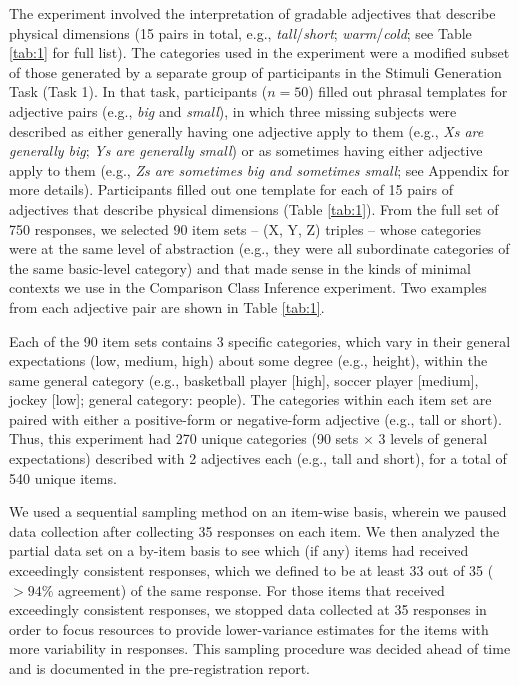 \documentclass[doc]{apa6}
\begin{document}
The experiment involved the interpretation of gradable adjectives that describe physical dimensions (15 pairs in total, e.g., \emph{tall}/\emph{short}; \emph{warm}/\emph{cold}; see Table \ref{tab:1} for full list). 
The categories used in the experiment were a modified subset of those generated by a separate group of participants in the Stimuli Generation Task (Task 1). 
In that task, participants ($n=50$) filled out phrasal templates for adjective pairs (e.g., \emph{big} and \emph{small}), in which three missing subjects were described as either generally having one adjective apply to them (e.g., \emph{Xs are generally big}; \emph{Ys are generally small}) or as sometimes having either adjective apply to them (e.g., \emph{Zs are sometimes big and sometimes small}; see Appendix for more details). 
Participants filled out one template for each of 15 pairs of adjectives that describe physical dimensions (Table \ref{tab:1}). 
From the full set of 750 responses, we selected 90 item sets -- (X, Y, Z)  triples -- whose categories were at the same level of abstraction  (e.g., they were all subordinate categories of the same basic-level category) and that made sense in the kinds of minimal contexts we use in the Comparison Class Inference experiment.
Two examples from each adjective pair are shown in Table \ref{tab:1}. 

Each of the 90 item sets contains 3 specific categories, which vary in their general expectations (low, medium, high) about some degree (e.g., height), within the same general category (e.g., basketball player [high], soccer player [medium], jockey [low]; general category: people). 
The categories within each item set are paired with either a positive-form or negative-form adjective (e.g., tall or short). 
Thus, this experiment had 270 unique categories (90 sets $\times$ 3 levels of general expectations) described with 2 adjectives each (e.g., tall and short), for a total of 540 unique items.

We used a sequential sampling method on an item-wise basis, wherein we paused data collection after collecting 35 responses on each item.
We then analyzed the partial data set on a by-item basis to see which (if any) items had received exceedingly consistent responses, which we defined to be at least 33 out of 35  ($>94\%$ agreement) of the same response. 
For those items that received exceedingly consistent responses, we stopped data collected at 35 responses in order to focus resources to provide lower-variance estimates for the items with more variability in responses. 
This sampling procedure was decided ahead of time and is documented in the pre-registration report. 
\end{document}
